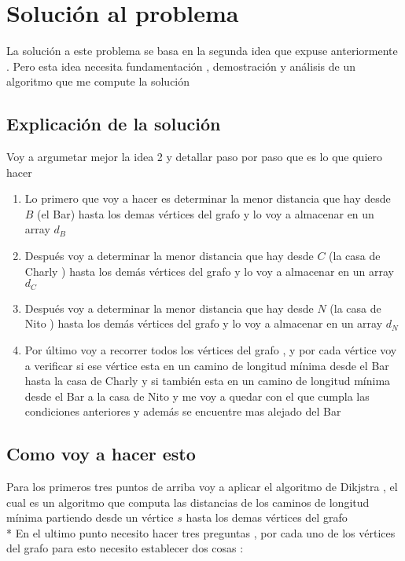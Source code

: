 \documentclass[10pt]{article}
\begin{document}
    \section{Soluci\'on al problema } 

    \noindent La soluci\'on a este problema se basa en la segunda idea que expuse anteriormente .
    Pero esta idea necesita fundamentaci\'on , demostraci\'on y an\'alisis de un algoritmo que me compute la soluci\'on 
    
    
    \subsection{Explicaci\'on de la soluci\'on }
    \noindent Voy a argumetar mejor la idea 2 y detallar paso por paso que es lo que quiero hacer 
    
    \begin{enumerate}
        \item Lo primero que voy a hacer es determinar la menor distancia que hay desde $B$ (el Bar) hasta los demas v\'ertices del grafo y lo voy a almacenar en un array $d_{B} $ 
        \item Despu\'es voy a determinar la menor distancia  que hay desde $C$ (la casa de Charly ) hasta los dem\'as v\'ertices del grafo y lo voy a almacenar en un array $d_{C}$
        \item Despu\'es voy a determinar la menor distancia  que hay desde $N$ (la casa de Nito ) hasta los dem\'as v\'ertices del grafo y lo voy a almacenar en un array $d_{N}$
        \item Por \'ultimo voy a recorrer todos los v\'ertices del grafo , y por cada v\'ertice voy a verificar si ese v\'ertice esta en un camino de longitud m\'inima desde el Bar hasta la casa de Charly y si tambi\'en esta en un camino de longitud m\'inima desde el Bar a la casa de Nito  y me voy a quedar con el que cumpla las condiciones anteriores y adem\'as se encuentre mas alejado del Bar   
    \end{enumerate}
     
    \subsection{Como voy a hacer esto } 

    \noindent Para los primeros tres puntos de arriba voy a aplicar el algoritmo de Dikjstra , el cual es un algoritmo que computa las distancias de los caminos de longitud m\'inima partiendo desde un v\'ertice $s$ hasta los demas v\'ertices del grafo 
    \\*
    En el ultimo punto necesito hacer tres preguntas , por cada uno de los v\'ertices del grafo para esto necesito establecer dos cosas : 
    
\end{document}
